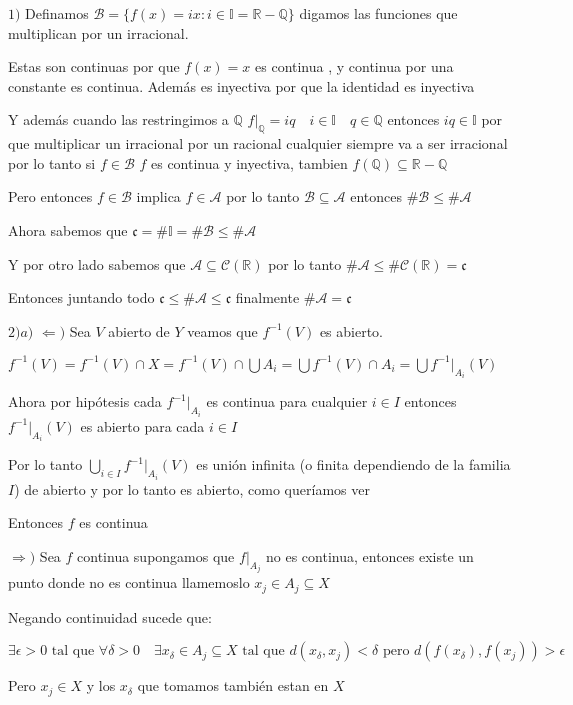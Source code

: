 \documentclass[12pt]{article}
\newcommand{\Q}{\mathbb{Q}}
\newcommand{\R}{\mathbb{R}}
\newcommand{\I}{\mathbb{I}}
\newcommand{\Ra}{\Rightarrow}
\theoremstyle{definition}
\begin{document}
$1)$ Definamos $\mathcal{B} = \{f(x) = ix : i \in \I = \R - \Q \}$ digamos las funciones que multiplican por un irracional.

Estas son continuas por que $f(x) = x$ es continua , y continua por una constante es continua. Además es inyectiva por que la identidad es inyectiva

Y además cuando las restringimos a $\Q$ $f|_{\Q} = iq \quad i \in \I \quad q \in \Q$ entonces $iq \in \I$ por que multiplicar un irracional por un racional cualquier siempre va a ser irracional por lo tanto si $f \in \mathcal{B}$ $f$ es continua y inyectiva, tambien $f(\Q) \subseteq \R - \Q$

Pero entonces $f \in \mathcal{B} $ implica $f \in \mathcal{A}$ por lo tanto $\mathcal{B} \subseteq \mathcal{A}$ entonces $\# \mathcal{B} \leq \# \mathcal{A}$ 

Ahora sabemos que $\mathfrak{c} = \# \I = \# \mathcal{B} \leq \# \mathcal{A}$ 

Y por otro lado sabemos que $\mathcal{A} \subseteq \mathcal{C}(\R)$ por lo tanto $\# \mathcal{A} \leq \# \mathcal{C}(\R) = \mathfrak{c}$

Entonces juntando todo $\mathfrak{c} \leq \# \mathcal{A} \leq \mathfrak{c}$ finalmente $\# \mathcal{A} = \mathfrak{c}$


$2) a)$ $\Leftarrow )$ Sea $V$ abierto de $Y$ veamos que $f^{-1}(V)$ es abierto.

$f^{-1}(V) = f^{-1}(V) \cap X  = f^{-1}(V) \cap \bigcup A_i = \bigcup f^{-1}(V) \cap A_i =\bigcup f^{-1}|_{A_i}(V) $

Ahora por hipótesis cada $f^{-1}|_{A_i}$ es continua para cualquier $i \in I$ entonces $f^{-1}|_{A_i}(V)$ es abierto para cada $i \in I$

Por lo tanto $\bigcup_{i \in I} f^{-1}|_{A_i}(V)$ es unión infinita (o finita dependiendo de la familia $I$) de abierto y por lo tanto es abierto, como queríamos ver

Entonces $f$ es continua

$\Ra )$  Sea $f$ continua supongamos que $f|_{A_j}$ no es continua, entonces existe un punto donde no es continua llamemoslo $x_j \in A_j \subseteq X$

Negando continuidad sucede que: 

$$ \exists \epsilon >0 \text{ tal que } \forall \delta >0 \quad \exists x_{\delta} \in A_j \subseteq X \text{ tal que } d(x_{\delta},x_j) < \delta \text{ pero } d(f(x_{\delta}),f(x_j)) > \epsilon $$

Pero $x_j \in X$ y los $x_{\delta}$ que tomamos también estan en $X$ 
\end{document}
